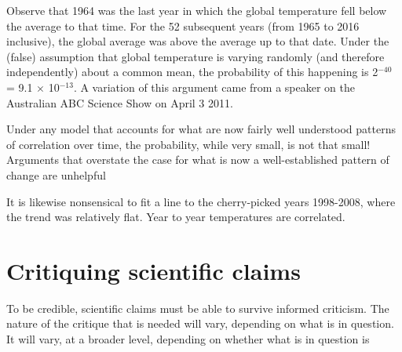 \documentclass[
  10ptls,
  b5paper]{book}
\begin{document}
Observe that 1964 was the last year in which the global temperature fell below the average to that time. For the 52 subsequent years (from 1965 to 2016 inclusive), the global average was above the average up to that date. Under the (false) assumption that global temperature is varying randomly (and therefore independently) about a common mean, the probability of this happening is 2\(^{-40}\) = 9.1 \(\times\) 10\(^{-13}\). A variation of this argument came from a speaker on the Australian ABC Science Show on April 3 2011.

Under any model that accounts for what are now fairly well understood patterns of correlation over time, the probability, while very small, is not that small! Arguments that overstate the case for what is now a well-established pattern of change are unhelpful

It is likewise nonsensical to fit a line to the cherry-picked years 1998-2008, where the trend was relatively flat. Year to year temperatures are correlated.

\chapter{Critiquing scientific claims}\label{critiquing-scientific-claims}

To be credible, scientific claims must be able to survive
informed criticism. The nature of the critique that is
needed will vary, depending on what is in question.
It will vary, at a broader level, depending on whether
what is in question is
\end{document}
